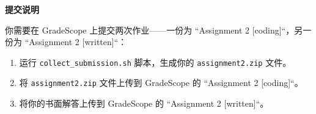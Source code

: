 \Large{\textbf{提交说明}}

\normalsize
你需要在 GradeScope 上提交两次作业——一份为 ``Assignment 2 [coding]``，另一份为 ``Assignment 2 [written]``：
\begin{enumerate}
    \item 运行 \texttt{collect\_submission.sh} 脚本，生成你的 \texttt{assignment2.zip} 文件。
    \item 将 \texttt{assignment2.zip} 文件上传到 GradeScope 的 ``Assignment 2 [coding]``。
    \item 将你的书面解答上传到 GradeScope 的 ``Assignment 2 [written]``。
\end{enumerate}